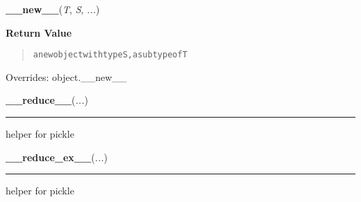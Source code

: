     \begin{boxedminipage}{\textwidth}

    \raggedright \textbf{\_\_new\_\_}(\textit{T}, \textit{S}, \textit{...})

      \textbf{Return Value}
      \begin{quote}
\begin{alltt}
a new object with type S, a subtype of T
\end{alltt}

      \end{quote}

    \vspace{1ex}

      Overrides: object.\_\_new\_\_

    \end{boxedminipage}

    \label{object:__reduce__}

    \vspace{0.5ex}

    \begin{boxedminipage}{\textwidth}

    \raggedright \textbf{\_\_reduce\_\_}(\textit{...})

    \vspace{-1.5ex}

    \rule{\textwidth}{0.5\fboxrule}

helper for pickle
    \vspace{1ex}

    \end{boxedminipage}

    \label{object:__reduce_ex__}

    \vspace{0.5ex}

    \begin{boxedminipage}{\textwidth}

    \raggedright \textbf{\_\_reduce\_ex\_\_}(\textit{...})

    \vspace{-1.5ex}

    \rule{\textwidth}{0.5\fboxrule}

helper for pickle
    \vspace{1ex}

    \end{boxedminipage}

    \vspace{0.5ex}

